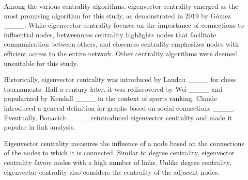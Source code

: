 Among the various centrality algorithms, eigenvector centrality emerged as the most promising algorithm for this study, as demonstrated in 2019 by Gómez ____.
While eigenvector centrality focuses on the importance of connections to influential nodes, betweenness centrality highlights nodes that facilitate communication between others, and closeness centrality emphasizes nodes with efficient access to the entire network.
Other centrality algorithms were deemed unsuitable for this study.


Historically, eigenvector centrality was introduced by Landau ____ for chess tournaments.
Half a century later, it was rediscovered by Wei ____ and popularized by Kendall ____ in the context of sports ranking.
Claude introduced a general definition for graphs based on social connections ____.
Eventually, Bonacich ____ reintroduced eigenvector centrality and made it popular in link analysis.


Eigenvector centrality measures the influence of a node based on the connections of the nodes to which it is connected.
Similar to degree centrality, eigenvector centrality favors nodes with a high number of links.
Unlike degree centrality, eigenvector centrality also considers the centrality of the adjacent nodes.


